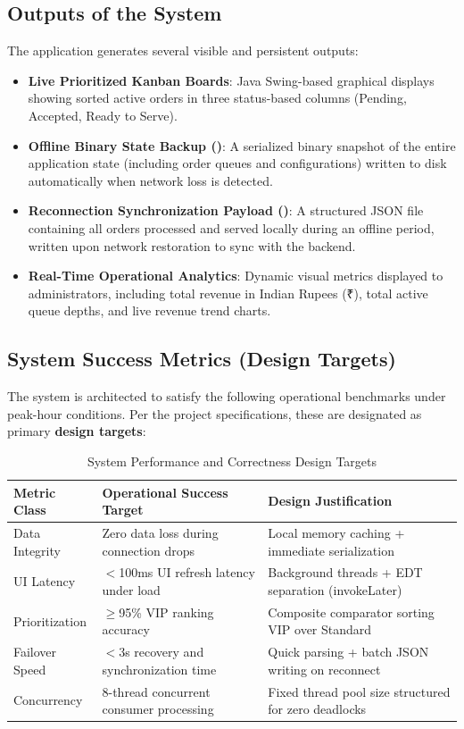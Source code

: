 \subsection{Outputs of the System}
The application generates several visible and persistent outputs:
\begin{itemize}
    \item \textbf{Live Prioritized Kanban Boards}: Java Swing-based graphical displays showing sorted active orders in three status-based columns (Pending, Accepted, Ready to Serve).
    \item \textbf{Offline Binary State Backup (\allowbreak{})}: A serialized binary snapshot of the entire application state (including order queues and configurations) written to disk automatically when network loss is detected.
    \item \textbf{Reconnection Synchronization Payload (\allowbreak{})}: A structured JSON file containing all orders processed and served locally during an offline period, written upon network restoration to sync with the backend.
    \item \textbf{Real-Time Operational Analytics}: Dynamic visual metrics displayed to administrators, including total revenue in Indian Rupees (₹), total active queue depths, and live revenue trend charts.
\end{itemize}

\subsection{System Success Metrics (Design Targets)}
The system is architected to satisfy the following operational benchmarks under peak-hour conditions. Per the project specifications, these are designated as primary \textbf{design targets}:
\begin{table}[H]
    \centering
    \caption{System Performance and Correctness Design Targets}
    \begin{tabularx}{\linewidth}{p{2.5cm}p{5cm}X}
        \toprule
        \textbf{Metric Class} & \textbf{Operational Success Target} & \textbf{Design Justification} \\
        \midrule
        Data Integrity & Zero data loss during connection drops & Local memory caching + immediate serialization \\
        UI Latency & $<$100ms UI refresh latency under load & Background threads + EDT separation (invokeLater) \\
        Prioritization & $\ge$95\% VIP ranking accuracy & Composite comparator sorting VIP over Standard \\
        Failover Speed & $<$3s recovery and synchronization time & Quick parsing + batch JSON writing on reconnect \\
        Concurrency & 8-thread concurrent consumer processing & Fixed thread pool size structured for zero deadlocks \\
        \bottomrule
    \end{tabularx}
    \label{tab:success_metrics}
\end{table}

